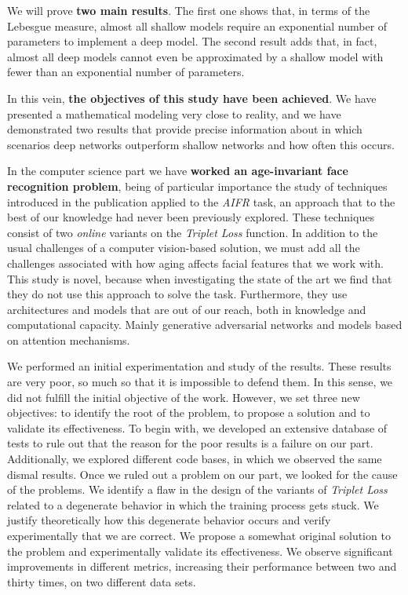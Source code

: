 We will prove \textbf{two main results}. The first one shows that, in terms of the Lebesgue measure, almost all shallow models require an exponential number of parameters to implement a deep model. The second result adds that, in fact, almost all deep models cannot even be approximated by a shallow model with fewer than an exponential number of parameters.

In this vein, \textbf{the objectives of this study have been achieved}. We have presented a mathematical modeling very close to reality, and we have demonstrated two results that provide precise information about in which scenarios deep networks outperform shallow networks and how often this occurs.

In the computer science part we have \textbf{worked an age-invariant face recognition problem}, being of particular importance the study of techniques introduced in the publication \cite{informatica:principal} applied to the \textit{AIFR} task, an approach that to the best of our knowledge had never been previously explored. These techniques consist of two \textit{online} variants on the \textit{Triplet Loss} function. In addition to the usual challenges of a computer vision-based solution, we must add all the challenges associated with how aging affects facial features that we work with. This study is novel, because when investigating the state of the art we find that they do not use this approach to solve the task. Furthermore, they use architectures and models that are out of our reach, both in knowledge and computational capacity. Mainly generative adversarial networks and models based on attention mechanisms.

We performed an initial experimentation and study of the results. These results are very poor, so much so that it is impossible to defend them. In this sense, we did not fulfill the initial objective of the work. However, we set three new objectives: to identify the root of the problem, to propose a solution and to validate its effectiveness. To begin with, we developed an extensive database of tests to rule out that the reason for the poor results is a failure on our part. Additionally, we explored different code bases, in which we observed the same dismal results. Once we ruled out a problem on our part, we looked for the cause of the problems. We identify a flaw in the design of the variants of \textit{Triplet Loss} related to a degenerate behavior in which the training process gets stuck. We justify theoretically how this degenerate behavior occurs and verify experimentally that we are correct. We propose a somewhat original solution to the problem and experimentally validate its effectiveness. We observe significant improvements in different metrics, increasing their performance between two and thirty times, on two different data sets.


